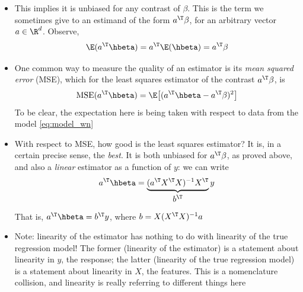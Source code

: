 \documentclass{article}
\begin{document}
\begin{itemize}
\item This implies it is unbiased for any contrast of $\beta$. This is the term 
  we sometimes give to an estimand of the form $a^\T\beta$, for an 
  arbitrary vector $a \in \R^d$. Observe, 
  \[
  \E(a^\T \hbeta) = a^\T \E(\hbeta) = a^\T \beta
  \]

\item One common way to measure the quality of an estimator is its \emph{mean
    squared error} (MSE), which for the least squares estimator  of the contrast $a^\T \beta$, is
  \[
  \MSE(a^\T \hbeta) = \E\big[ (a^\T \hbeta - a^\T \beta)^2 \big]
  \]
  To be clear, the expectation here is being taken with respect to data from the
  model \eqref{eq:model_wn} 

\item With respect to MSE, how good is the least squares estimator? It is, in a
  certain precise sense, the \emph{best}. It is both unbiased for $a^\T \beta$,
  as proved above, and also a \emph{linear} estimator as a function of $y$: we
  can write  
  \[
  a^\T \hbeta = \underbrace{(a^\T X^\T X)^{-1}
    X^\T}_{\textstyle \begin{array}{c} b^\T \end{array}} y  
  \]
  That is, $a^\T \hbeta = b^\T y$, where $b = X (X^\T X)^{-1} a$ 


\item Note: linearity of the estimator has nothing to do with linearity of the
  true regression model! The former (linearity of the estimator) is a statement
  about linearity in $y$, the response; the latter (linearity of the true
  regression model) is a statement about linearity in $X$, the features. This
  is a nomenclature collision, and linearity is really referring to different
  things here 


\end{itemize}
\end{document}
